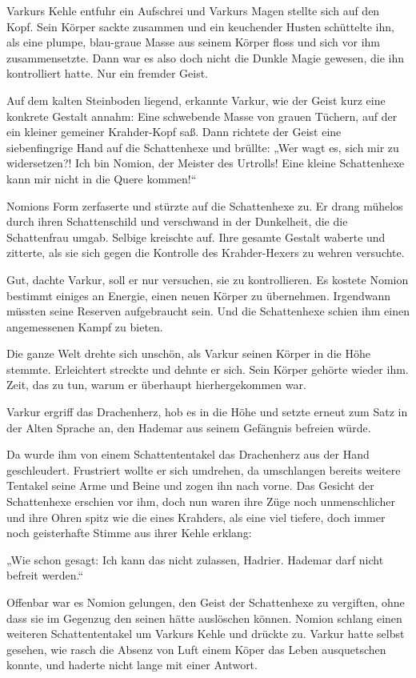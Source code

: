 \documentclass[10pt, a4paper, oneside]{book}
\begin{document}
Varkurs Kehle entfuhr ein Aufschrei und Varkurs Magen stellte sich auf den Kopf. Sein Körper sackte zusammen und ein keuchender Husten schüttelte ihn, als eine plumpe, blau-graue Masse aus seinem Körper floss und sich vor ihm zusammensetzte. Dann war es also doch nicht die Dunkle Magie gewesen, die ihn kontrolliert hatte. Nur ein fremder Geist.

Auf dem kalten Steinboden liegend, erkannte Varkur, wie der Geist kurz eine konkrete Gestalt annahm: Eine schwebende Masse von grauen Tüchern, auf der ein kleiner gemeiner Krahder-Kopf saß. Dann richtete der Geist eine siebenfingrige Hand auf die Schattenhexe und brüllte: „Wer wagt es, sich mir zu widersetzen?! Ich bin Nomion, der Meister des Urtrolls! Eine kleine Schattenhexe kann mir nicht in die Quere kommen!“

Nomions Form zerfaserte und stürzte auf die Schattenhexe zu. Er drang mühelos durch ihren Schattenschild und verschwand in der Dunkelheit, die die Schattenfrau umgab. Selbige kreischte auf. Ihre gesamte Gestalt waberte und zitterte, als sie sich gegen die Kontrolle des Krahder-Hexers zu wehren versuchte.

Gut, dachte Varkur, soll er nur versuchen, sie zu kontrollieren. Es kostete Nomion bestimmt einiges an Energie, einen neuen Körper zu übernehmen. Irgendwann müssten seine Reserven aufgebraucht sein. Und die Schattenhexe schien ihm einen angemessenen Kampf zu bieten.

Die ganze Welt drehte sich unschön, als Varkur seinen Körper in die Höhe stemmte. Erleichtert streckte und dehnte er sich. Sein Körper gehörte wieder ihm. Zeit, das zu tun, warum er überhaupt hierhergekommen war.

Varkur ergriff das Drachenherz, hob es in die Höhe und setzte erneut zum Satz in der Alten Sprache an, den Hademar aus seinem Gefängnis befreien würde.

Da wurde ihm von einem Schattententakel das Drachenherz aus der Hand geschleudert. Frustriert wollte er sich umdrehen, da umschlangen bereits weitere Tentakel seine Arme und Beine und zogen ihn nach vorne. Das Gesicht der Schattenhexe erschien vor ihm, doch nun waren ihre Züge noch unmenschlicher und ihre Ohren spitz wie die eines Krahders, als eine viel tiefere, doch immer noch geisterhafte Stimme aus ihrer Kehle erklang:

„Wie schon gesagt: Ich kann das nicht zulassen, Hadrier. Hademar darf nicht befreit werden.“

Offenbar war es Nomion gelungen, den Geist der Schattenhexe zu vergiften, ohne dass sie im Gegenzug den seinen hätte auslöschen können. Nomion schlang einen weiteren Schattententakel um Varkurs Kehle und drückte zu. Varkur hatte selbst gesehen, wie rasch die Absenz von Luft einem Köper das Leben ausquetschen konnte, und haderte nicht lange mit einer Antwort.
\end{document}

